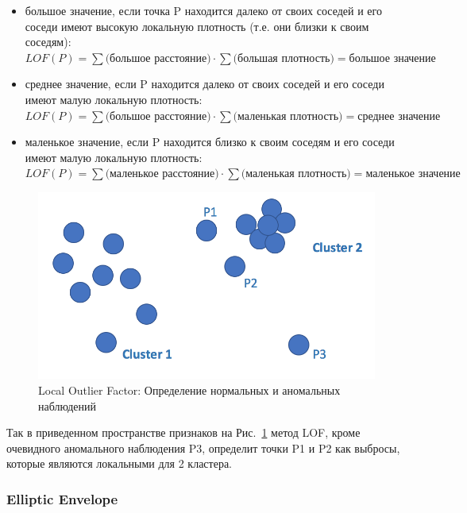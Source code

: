 \documentclass[12pt]{article}
\begin{document}
    \begin{itemize}
        \item большое значение, если точка P находится далеко от своих соседей и его соседи имеют высокую локальную плотность (т.е. они близки к своим соседям): \\ 
        $ LOF(P) = \sum {\text{(большое расстояние)}} \cdot \sum \text{(большая плотность)} = \text{большое значение}$
        \item среднее значение, если P находится далеко от своих соседей и его соседи имеют малую локальную плотность: \\
        $ LOF(P) = \sum \text{(большое расстояние)} \cdot \sum \text{(маленькая плотность)} = \text{среднее значение} $
        \item маленькое значение, если P находится близко к своим соседям и его соседи имеют малую локальную плотность: \\
        $ LOF(P) = \sum \text{(маленькое расстояние)} \cdot \sum \text{(маленькая плотность)} = \text{маленькое значение} $
    \end{itemize}
    
    \begin{figure}[h!]
        \centering
        \includegraphics[width=0.6\linewidth]{LocalOutlierFactor.png}
        \caption{Local Outlier Factor: Определение нормальных и аномальных наблюдений}
        \label{sec:Research:Model:LocalOutlierFactor:fig:LocalOutlierFactor}
    \end{figure}

    \par Так в приведенном пространстве признаков на Рис.~\ref{sec:Research:Model:LocalOutlierFactor:fig:LocalOutlierFactor} метод LOF, кроме очевидного аномального наблюдения P3, определит точки P1 и P2 как выбросы, которые являются локальными для 2 кластера.


    \subsubsection{Elliptic Envelope}
    \label{sec:Research:Model:EllipticEnvelope}
\end{document}

